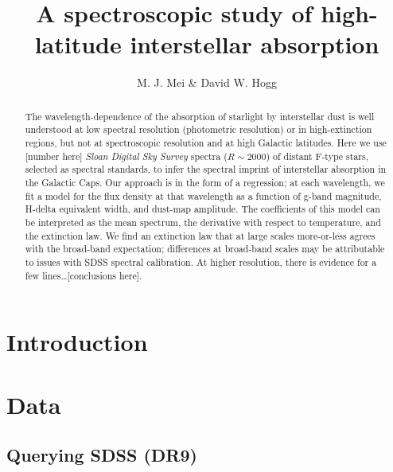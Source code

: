 \documentclass[preprint]{aastex}
\begin{document}
\title{A spectroscopic study of high-latitude interstellar absorption}

\author{M. J. Mei \& David W. Hogg}


\begin{abstract}
The wavelength-dependence of the absorption of starlight by interstellar dust
  is well understood at low spectral resolution (photometric resolution)
  or in high-extinction regions,
  but not at spectroscopic resolution and at high Galactic latitudes.
Here we use [number here] \textsl{Sloan Digital Sky Survey} spectra ($R\sim 2000$)
  of distant F-type stars,
  selected as spectral standards,
  to infer the spectral imprint of interstellar absorption in the Galactic Caps.
Our approach is in the form of a regression;
  at each wavelength,
  we fit a model for the flux density at that wavelength as a function of g-band magnitude,
  H-delta equivalent width,
  and dust-map amplitude.
The coefficients of this model can be interpreted as the mean spectrum,
  the derivative with respect to temperature,
  and the extinction law.
We find an extinction law that at large scales more-or-less agrees with the broad-band expectation;
  differences at broad-band scales may be attributable to issues with SDSS spectral calibration.
At higher resolution, there is evidence for a few lines\ldots [conclusions here].
\end{abstract}


\section{Introduction}

\section{Data}
\subsection{Querying SDSS (DR9)}
\end{document}
